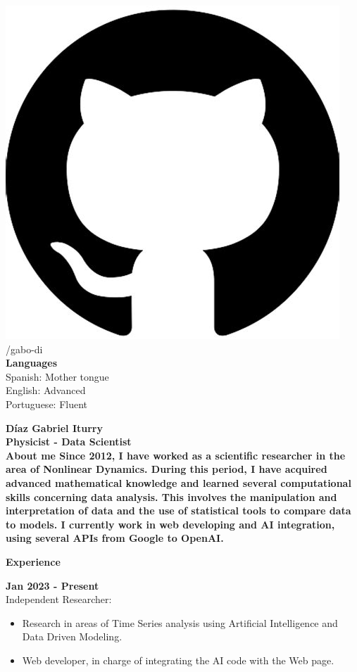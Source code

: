 \documentclass[a4paper,12pt,final]{memoir}
\newcommand{\Sep}{\vspace{1.5em}}
\newcommand{\SmallSep}{\vspace{0.5em}}
\newenvironment{AboutMe}
	{\ignorespaces\textbf{\color{RoyalBlue} About me}}
	{\Sep\ignorespacesafterend}
\newcommand{\CVSection}[1]
	{\Large\textbf{#1}\par
	\SmallSep\normalsize\normalfont}
\newcommand{\CVItem}[1]
	{\textbf{\color{RoyalBlue} #1}}
\begin{document}
\begin{flushleft}
    \vspace{1mm}
    \includegraphics[width=0.07\columnwidth]{git.jpeg} /gabo-di \\
    \vspace{1mm}
    \vspace{4mm}
	\textbf{Languages}\\
	\vspace{1mm}
	Spanish: Mother tongue\\
	\vspace{1mm}
	English: Advanced\\
	\vspace{1mm}
	Portuguese: Fluent
\end{flushleft}\normalsize


\framebreak



\Huge\bfseries {\color{RoyalBlue} D\'iaz Gabriel Iturry} \\
\Large\bfseries Physicist - Data Scientist\\

\normalsize\normalfont
\vspace{-10pt} 
\begin{AboutMe}
Since 2012, I have worked as a scientific researcher in the area of Nonlinear Dynamics. During this period, I have acquired advanced mathematical knowledge and learned several computational skills concerning data analysis. This involves the manipulation and interpretation of data and the use of statistical tools to compare data to models. I currently work in web developing and AI integration, using several APIs from Google to OpenAI.
\end{AboutMe}

\vspace{-15pt} 
\CVSection{Experience}
\CVItem{Jan 2023 - Present}\\
{\small Independent Researcher:}
\begin{footnotesize}
\begin{itemize}
\item Research in areas of Time Series analysis using Artificial Intelligence and Data Driven Modeling. 
\item Web developer, in charge of integrating the AI code with the Web page.
\end{itemize}
\end{footnotesize}
\SmallSep
\end{document}
